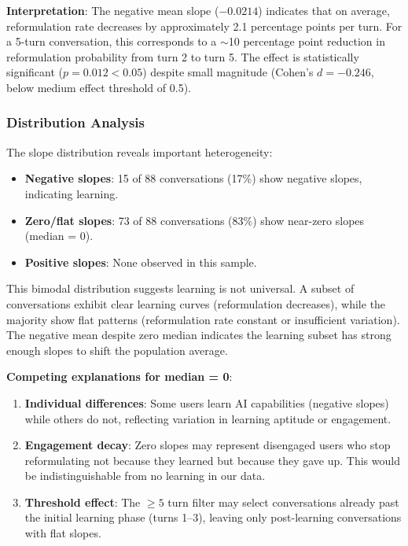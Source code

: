 \textbf{Interpretation}: The negative mean slope ($-0.0214$) indicates that on average, reformulation rate decreases by approximately 2.1 percentage points per turn. For a 5-turn conversation, this corresponds to a $\sim$10 percentage point reduction in reformulation probability from turn 2 to turn 5. The effect is statistically significant ($p = 0.012 < 0.05$) despite small magnitude (Cohen's $d = -0.246$, below medium effect threshold of 0.5).

\subsubsection{Distribution Analysis}

The slope distribution reveals important heterogeneity:

\begin{itemize}
\item \textbf{Negative slopes}: 15 of 88 conversations (17\%) show negative slopes, indicating learning.
\item \textbf{Zero/flat slopes}: 73 of 88 conversations (83\%) show near-zero slopes (median = 0).
\item \textbf{Positive slopes}: None observed in this sample.
\end{itemize}

This bimodal distribution suggests learning is not universal. A subset of conversations exhibit clear learning curves (reformulation decreases), while the majority show flat patterns (reformulation rate constant or insufficient variation). The negative mean despite zero median indicates the learning subset has strong enough slopes to shift the population average.

\textbf{Competing explanations for median = 0}:

\begin{enumerate}
\item \textbf{Individual differences}: Some users learn AI capabilities (negative slopes) while others do not, reflecting variation in learning aptitude or engagement.
\item \textbf{Engagement decay}: Zero slopes may represent disengaged users who stop reformulating not because they learned but because they gave up. This would be indistinguishable from no learning in our data.
\item \textbf{Threshold effect}: The $\geq 5$ turn filter may select conversations already past the initial learning phase (turns 1--3), leaving only post-learning conversations with flat slopes.
\end{enumerate}

